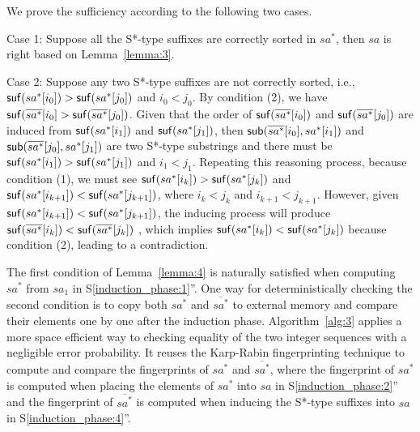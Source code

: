 \documentclass[10pt,journal,compsoc]{IEEEtran}
\begin{document}
\begin{IEEEproof}

    We prove the sufficiency according to the following two cases.

    Case 1: Suppose all the S*-type suffixes are correctly sorted in $sa^*$, then $sa$ is right based on Lemma~\ref{lemma:3}.

    Case 2: Suppose any two S*-type suffixes are not correctly sorted, i.e., ${\sf suf}(sa^*[i_0]) > {\sf suf}(sa^*[j_0])$ and $i_0 < j_0$. By condition (2), we have ${\sf suf}(\overline{sa^*}[i_0] > {\sf suf}(\overline{sa^*}[j_0])$. Given that the order of ${\sf suf}(\overline{sa^*}[i_0])$ and ${\sf suf}(\overline{sa^*}[j_0])$ are induced from ${\sf suf}(sa^*[i_1])$ and ${\sf suf}(sa^*[j_1])$, then ${\sf sub}(\overline{sa^*}[i_0], sa^*[i_1])$ and ${\sf sub}(\overline{sa^*}[j_0], sa^*[j_1])$ are two S*-type substrings and there must be ${\sf suf}(sa^*[i_1])>{\sf suf}(sa^*[j_1])$ and $i_1 < j_1$. Repeating this reasoning process, because condition (1), we must see ${\sf suf}(sa^*[i_k])>{\sf suf}(sa^*[j_k])$ and ${\sf suf}(sa^*[i_{k+1}])<{\sf suf}(sa^*[j_{k+1}])$, where $i_k < j_k$ and $i_{k+1} < j_{k+1}$. However, given ${\sf suf}(sa^*[i_{k+1}])<{\sf suf}(sa^*[j_{k+1}])$, the inducing process will produce ${\sf suf}(\overline{sa^*}[i_k])<{\sf suf}(\overline{sa^*}[j_k])$ , which implies ${\sf suf}(sa^*[i_k])<{\sf suf}(sa^*[j_k])$ because condition (2), leading to a contradiction.
	
\end{IEEEproof}
	

The first condition of Lemma~\ref{lemma:4} is naturally satisfied when computing $sa^*$ from $sa_1$ in S\ref{induction_phase:1}''. One way for deterministically checking the second condition is to copy both $sa^*$ and $\overline{sa^*}$ to external memory and compare their elements one by one after the induction phase. Algorithm~\ref{alg:3} applies a more space efficient way to checking equality of the two integer sequences with a negligible error probability. It reuses the Karp-Rabin fingerprinting technique to compute and compare the fingerprints of $sa^*$ and $\overline{sa^*}$, where the fingerprint of $sa^*$ is computed when placing the elements of $sa^*$ into $sa$ in S\ref{induction_phase:2}'' and the fingerprint of $\overline{sa^*}$ is computed when inducing the S*-type suffixes into $sa$ in S\ref{induction_phase:4}''. 


\end{document}
